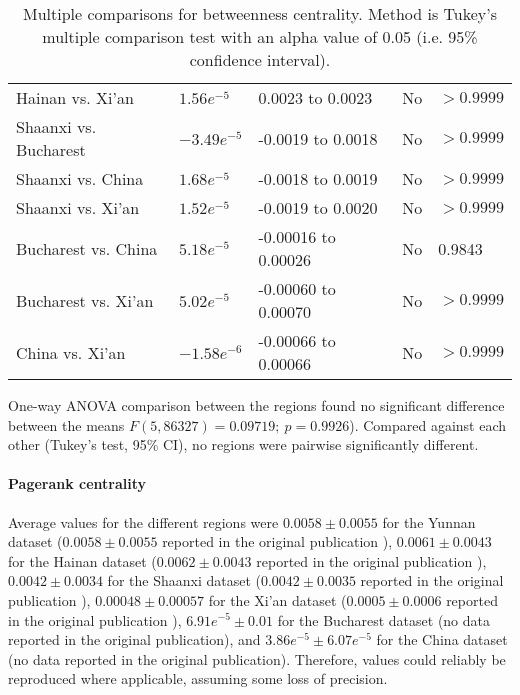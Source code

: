 \begin{table}[h]
\begin{mdframed}
\begin{tabular*}{\linewidth}{l|llll}
			Hainan vs. Xi'an & $1.56e^{-5}$ & 0.0023 to 0.0023 & No & $>0.9999$\\
			Shaanxi vs. Bucharest & $-3.49e^{-5}$ & -0.0019 to 0.0018 & No & $>0.9999$\\
			Shaanxi vs. China & $1.68e^{-5}$ & -0.0018 to 0.0019 & No & $>0.9999$\\
			Shaanxi vs. Xi'an & $1.52e^{-5}$ & -0.0019 to 0.0020 & No & $>0.9999$\\
			Bucharest vs. China & $5.18e^{-5}$ & -0.00016 to 0.00026 & No & 0.9843\\
			Bucharest vs. Xi'an & $5.02e^{-5}$ & -0.00060 to 0.00070 & No & $>0.9999$\\
			China vs. Xi'an & $-1.58e^{-6}$ & -0.00066 to 0.00066 & No & $>0.9999$\\
			\hline
		\end{tabular*}
		\caption{Multiple comparisons for betweenness centrality. Method is Tukey's multiple comparison test with an alpha value of 0.05 (i.e. 95\% confidence interval).}
		\label{tab:betweenness_centrality_tukey}
	\end{mdframed}
\end{table}

One-way ANOVA comparison between the regions found no significant difference between the means $F(5,86327) = 0.09719; \: p=0.9926$). Compared against each other (Tukey's test, 95\% CI), no regions were pairwise significantly different.

\paragraph{Pagerank centrality} Average values for the different regions were $0.0058\pm0.0055$ for the Yunnan dataset ($0.0058\pm0.0055$ reported in the original publication \cite{hainan_publication}), $0.0061\pm0.0043$ for the Hainan dataset ($0.0062\pm0.0043$ reported in the original publication \cite{hainan_publication}), $0.0042\pm0.0034$ for the Shaanxi dataset ($0.0042\pm0.0035$ reported in the original publication \cite{shaanxi_publication}), $0.00048\pm0.00057$ for the Xi'an dataset ($0.0005\pm0.0006$ reported in the original publication \cite{xian_publication}), $6.91e^{-5}\pm0.01$ for the Bucharest dataset (no data reported in the original publication), and $3.86e^{-5}\pm6.07e^{-5}$ for the China dataset (no data reported in the original publication). Therefore, values could reliably be reproduced where applicable, assuming some loss of precision.

